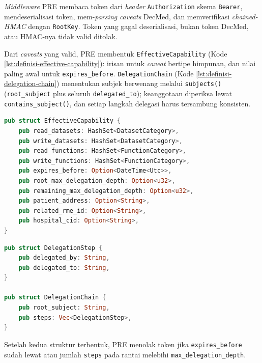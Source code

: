 \textit{Middleware} PRE membaca token dari \textit{header} \texttt{Authorization} skema \texttt{Bearer}, mendeserialisasi token, mem-\textit{parsing} \textit{caveats} DecMed, dan memverifikasi \textit{chained-HMAC} dengan \texttt{RootKey}. Token yang gagal deserialisasi, bukan token DecMed, atau HMAC-nya tidak valid ditolak.

Dari \textit{caveats} yang valid, PRE membentuk \texttt{EffectiveCapability} (Kode \ref{lst:definisi-effective-capability}): irisan untuk \textit{caveat} bertipe himpunan, dan nilai paling awal untuk \texttt{expires\_before}. \texttt{DelegationChain} (Kode \ref{lst:definisi-delegation-chain}) menentukan subjek berwenang melalui \texttt{subjects()} (\texttt{root\_subject} plus seluruh \texttt{delegated\_to}); keanggotaan diperiksa lewat \texttt{contains\_subject()}, dan setiap langkah delegasi harus tersambung konsisten.

\begin{lstlisting}[language=Rust, caption={Definisi \texttt{EffectiveCapability}}, label={lst:definisi-effective-capability}]
pub struct EffectiveCapability {
    pub read_datasets: HashSet<DatasetCategory>,
    pub write_datasets: HashSet<DatasetCategory>,
    pub read_functions: HashSet<FunctionCategory>,
    pub write_functions: HashSet<FunctionCategory>,
    pub expires_before: Option<DateTime<Utc>>,
    pub root_max_delegation_depth: Option<u32>,
    pub remaining_max_delegation_depth: Option<u32>,
    pub patient_address: Option<String>,
    pub related_rme_id: Option<String>,
    pub hospital_cid: Option<String>,
}
\end{lstlisting}

\begin{lstlisting}[language=Rust, caption={Definisi \texttt{DelegationStep} dan \texttt{DelegationChain}}, label={lst:definisi-delegation-chain}]
pub struct DelegationStep {
    pub delegated_by: String,
    pub delegated_to: String,
}

pub struct DelegationChain {
    pub root_subject: String,
    pub steps: Vec<DelegationStep>,
}
\end{lstlisting}

Setelah kedua struktur terbentuk, PRE menolak token jika \texttt{expires\_before} sudah lewat atau jumlah \texttt{steps} pada rantai melebihi \texttt{max\_delegation\_depth}.

